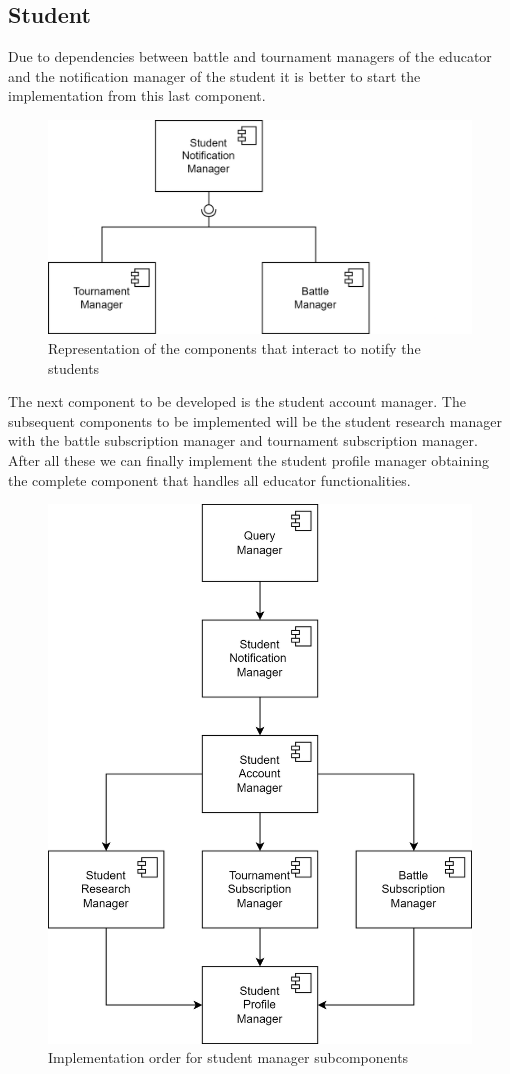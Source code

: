 \documentclass[12pt, a4paper]{report}
\begin{document}
    \subsection{Student}
    Due to dependencies between battle and tournament managers of the educator and the notification manager of the student it is better to start the implementation from this last component.
    \begin{figure}[H]
        \centering
        \includegraphics[width=0.5\linewidth]{images/notifications.png}
        \caption{Representation of the components that interact to notify the students}
    \end{figure}
    The next component to be developed is the student account manager. 
    The subsequent components to be implemented will be the student research manager with the battle subscription manager and tournament subscription manager. 
    After all these we can finally implement the student profile manager obtaining the complete component that handles all educator functionalities. 
    \begin{figure}[H]
        \centering
        \includegraphics[width=0.5\linewidth]{images/student_impl.png}
        \caption{Implementation order for student manager subcomponents}
    \end{figure}
\end{document}
